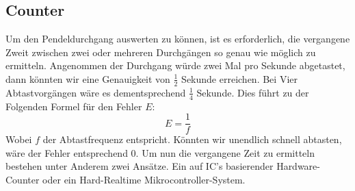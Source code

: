 \subsection{Counter}
	Um den Pendeldurchgang auswerten zu können, ist es erforderlich, die vergangene Zweit zwischen zwei oder mehreren Durchgängen so genau wie möglich zu ermitteln. Angenommen der Durchgang würde zwei Mal pro Sekunde abgetastet, dann könnten wir eine Genauigkeit von $\frac{1}{2}$ Sekunde erreichen. Bei Vier Abtastvorgängen wäre es dementsprechend $\frac{1}{4}$ Sekunde. Dies führt zu der Folgenden Formel für den Fehler $E$:
	\[
		E = \frac{1}{f}
	\]
	Wobei $f$ der Abtastfrequenz entspricht. Könnten wir unendlich schnell abtasten, wäre der Fehler entsprechend 0. Um nun die vergangene Zeit zu ermitteln bestehen unter Anderem zwei Ansätze. Ein auf IC's basierender Hardware-Counter oder ein Hard-Realtime Mikrocontroller-System.
